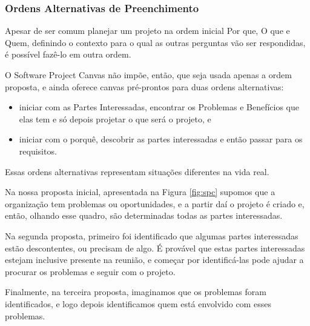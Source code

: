 \documentclass[a4]{report}
\begin{document}
\subsubsection{Ordens Alternativas de Preenchimento}

Apesar de ser comum planejar um projeto na ordem inicial Por que, O que e Quem, definindo o contexto para o qual as outras perguntas vão ser respondidas, é possível fazê-lo em outra ordem.

O Software Project Canvas não impõe, então, que seja usada apenas a ordem proposta, e ainda oferece canvas pré-prontos para duas ordens alternativas:
\begin{itemize}
    \item iniciar com as Partes Interessadas, encontrar os Problemas e Benefícios que elas tem e só depois projetar o que será o projeto, e
    \item iniciar com o porquê, descobrir as partes interessadas e então passar para os requisitos.
\end{itemize}

Essas ordens alternativas representam situações diferentes na vida real.

Na nossa proposta inicial, apresentada na Figura \ref{fig:spc} supomos que a organização tem problemas ou oportunidades, e a partir daí o projeto é criado e, então, olhando esse quadro, são determinadas todas as partes interessadas.

Na segunda proposta, primeiro foi identificado que algumas partes interessadas estão descontentes, ou precisam de algo. É provável que estas partes interessadas estejam inclusive presente na reunião, e começar por identificá-las pode ajudar a procurar os problemas e seguir com o projeto.

Finalmente, na terceira proposta, imaginamos que os problemas foram identificados, e logo depois identificamos quem está envolvido com esses problemas.
\end{document}

